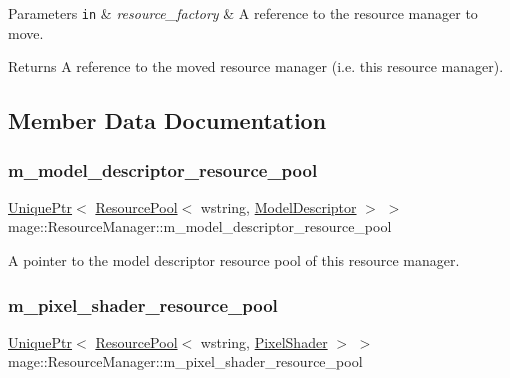 \begin{DoxyParams}[1]{Parameters}
\mbox{\tt in}  & {\em resource\+\_\+factory} & A reference to the resource manager to move. \\
\hline
\end{DoxyParams}
\begin{DoxyReturn}{Returns}
A reference to the moved resource manager (i.\+e. this resource manager). 
\end{DoxyReturn}


\subsection{Member Data Documentation}
\hypertarget{classmage_1_1_resource_manager_a26991ee1ef428871c8c7e1464613a36a}{}\label{classmage_1_1_resource_manager_a26991ee1ef428871c8c7e1464613a36a} 
\subsubsection{\texorpdfstring{m\+\_\+model\+\_\+descriptor\+\_\+resource\+\_\+pool}{m\_model\_descriptor\_resource\_pool}}
{\footnotesize\ttfamily \hyperlink{namespacemage_a3316d7143a973e37adf1110f2e80ca31}{Unique\+Ptr}$<$ \hyperlink{classmage_1_1_resource_pool}{Resource\+Pool}$<$ wstring, \hyperlink{classmage_1_1_model_descriptor}{Model\+Descriptor} $>$ $>$ mage\+::\+Resource\+Manager\+::m\+\_\+model\+\_\+descriptor\+\_\+resource\+\_\+pool\hspace{0.3cm}{\ttfamily [private]}}

A pointer to the model descriptor resource pool of this resource manager. \hypertarget{classmage_1_1_resource_manager_a139203cf050a3a8146f89b4b643d6092}{}\label{classmage_1_1_resource_manager_a139203cf050a3a8146f89b4b643d6092} 
\subsubsection{\texorpdfstring{m\+\_\+pixel\+\_\+shader\+\_\+resource\+\_\+pool}{m\_pixel\_shader\_resource\_pool}}
{\footnotesize\ttfamily \hyperlink{namespacemage_a3316d7143a973e37adf1110f2e80ca31}{Unique\+Ptr}$<$ \hyperlink{classmage_1_1_resource_pool}{Resource\+Pool}$<$ wstring, \hyperlink{classmage_1_1_pixel_shader}{Pixel\+Shader} $>$ $>$ mage\+::\+Resource\+Manager\+::m\+\_\+pixel\+\_\+shader\+\_\+resource\+\_\+pool\hspace{0.3cm}{\ttfamily [private]}}

